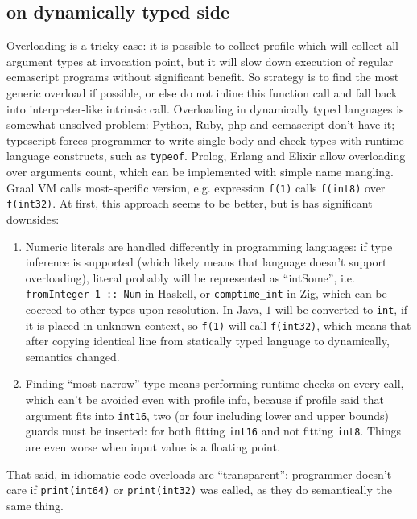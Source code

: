 \documentclass[times, %
	specification,annotation, %
	titlepage-extra-ru,specification-extra-ru,annotation-extra-ru, %
	languages={russian,english} %
	]{itmo-student-thesis}
\begin{document}
\subsection{on dynamically typed side}
Overloading is a tricky case: it is possible to collect profile which will collect all argument types at invocation point, but it will slow down execution of regular ecmascript programs without significant benefit. So strategy is to find the most generic overload if possible, or else do not inline this function call and fall back into interpreter-like intrinsic call. Overloading in dynamically typed languages is somewhat unsolved problem: Python, Ruby, php and ecmascript don't have it; typescript forces programmer to write single body and check types with runtime language constructs, such as \texttt{typeof}. Prolog, Erlang and Elixir allow overloading over arguments count, which can be implemented with simple name mangling.\\
Graal VM calls most-specific version, e.g. expression \texttt{f(1)} calls \texttt{f(int8)} over \texttt{f(int32)}. At first, this approach seems to be better, but is has significant downsides:\\
\begin{enumerate}
	\item Numeric literals are handled differently in programming languages: if type inference is supported (which likely means that language doesn't support overloading), literal probably will be represented as ``intSome'', i.e. \texttt{fromInteger 1 :: Num} in Haskell, or \texttt{comptime\_int} in Zig, which can be coerced to other types upon resolution. In Java, $1$ will be converted to \texttt{int}, if it is placed in unknown context, so \texttt{f(1)} will call \texttt{f(int32)}, which means that after copying identical line from statically typed language to dynamically, semantics changed.
	\item Finding ``most narrow'' type means performing runtime checks on every call, which can't be avoided even with profile info, because if profile said that argument fits into \texttt{int16}, two (or four including lower and upper bounds) guards must be inserted: for both fitting \texttt{int16} and not fitting \texttt{int8}. Things are even worse when input value is a floating point.
\end{enumerate}
That said, in idiomatic code overloads are ``transparent'': programmer doesn't care if \texttt{print(int64)} or \texttt{print(int32)} was called, as they do semantically the same thing.
\end{document}
